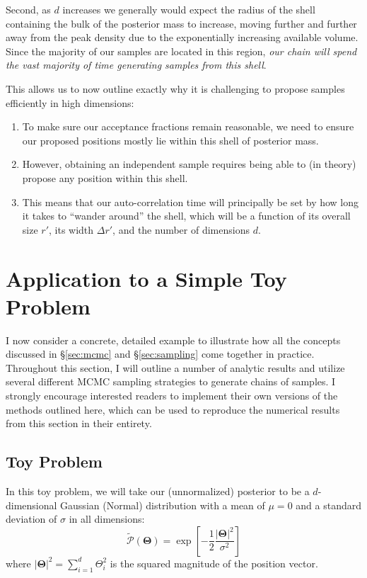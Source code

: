 \documentclass[12pt, titlepage]{article}
\newcommand{\params}{\ensuremath{\boldsymbol\Theta}}
\newcommand{\posterior}{\ensuremath{\mathcal{P}}}
\begin{document}
Second, as $d$ increases we generally would expect the radius of the
shell containing the bulk of the posterior mass to increase, moving further
and further away from the peak density due to the exponentially increasing
available volume. Since the majority of our samples are located in this
region, \textit{our chain will spend the vast majority 
of time generating samples from this shell}.

This allows us to now outline exactly why it is challenging
to propose samples efficiently in high dimensions:
\begin{enumerate}
    \item To make sure our acceptance fractions remain reasonable, 
    we need to ensure our proposed positions mostly lie within 
    this shell of posterior mass.
    \item However, obtaining an independent sample requires 
    being able to (in theory) propose any position within this shell.
    \item This means that our auto-correlation time
    will principally be set by how long it takes to ``wander around''
    the shell, which will be a function of its overall size $r'$,
    its width $\Delta r'$, and the number of dimensions $d$.
\end{enumerate}

\section{Application to a Simple Toy Problem} \label{sec:example}

I now consider a concrete, detailed example
to illustrate how all the concepts discussed in \S\ref{sec:mcmc} and
\S\ref{sec:sampling} come together in practice. 
Throughout this section, I will outline a number of analytic
results and utilize several different MCMC sampling strategies
to generate chains of samples. I strongly encourage interested readers
to implement their own versions of the methods outlined here,
which can be used to reproduce the numerical results from this section
in their entirety.

\subsection{Toy Problem} \label{subsec:analytic}

In this toy problem, we will take our (unnormalized) 
posterior to be a $d$-dimensional 
Gaussian (Normal) distribution with a mean
of $\mu = 0$ and a standard deviation of $\sigma$
in all dimensions:
\begin{equation}
    \tilde{\posterior}(\params) 
    = \exp\left[-\frac{1}{2}\frac{|\params|^2}{\sigma^2}\right]
\end{equation}
where $|\params|^2 = \sum_{i=1}^{d} \Theta_i^2$ is the squared magnitude
of the position vector.
\end{document}
